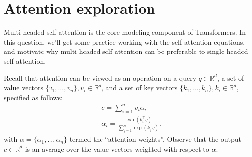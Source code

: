 
\section{Attention exploration}
\label{sec:analysis}
Multi-headed self-attention is the core modeling component of Transformers.
In this question, we'll get some practice working with the self-attention equations, and motivate why multi-headed self-attention can be preferable to single-headed self-attention.

Recall that attention can be viewed as an operation on a query $q\in\mathbb{R}^d$, a set of value vectors $\{v_1,\dots,v_n\}, v_i\in\mathbb{R}^d$, and a set of key vectors $\{k_1,\dots,k_n\}, k_i \in \mathbb{R}^d$, specified as follows:
\begin{align}
&c = \sum_{i=1}^{n} v_i \alpha_i \\
&\alpha_i = \frac{\exp(k_i^\top q)}{\sum_{j=1}^{n} \exp(k_j^\top q)}.
\end{align}
with $\alpha = \{\alpha_1, \ldots, \alpha_n\}$ termed the ``attention weights''. 
Observe that the output $c\in\mathbb{R}^d$ is an average over the value vectors weighted with respect to $\alpha$.



